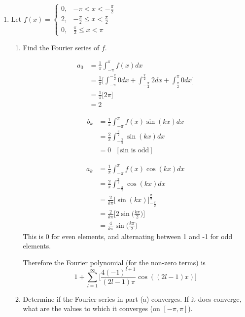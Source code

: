 \documentclass{article}
\begin{document}
\thispagestyle{fancy}

\begin{enumerate}
\item Let $\displaystyle f(x) = 
\begin{cases}
        0, &- \pi < x < -\frac{\pi}{2} \\
        2, &- \frac{\pi}{2}\leq x < \frac{\pi}{2} \\
        0, & \frac{\pi}{2} \leq x < \pi
\end{cases}
$
\begin{enumerate}
\item Find the Fourier series of $f$.
\begin{multicols}{2}
\noindent

\begin{align*}
a_0 &= \frac{1}{\pi} \int_{-\pi}^{\pi}f(x)dx \\
&= \frac{1}{\pi} \Bigg[ \int_{-\pi}^{-\frac{\pi}{2}}0dx + \int_{-\frac{\pi}{2}}^{\frac{\pi}{2}}2dx + \int_{\frac{\pi}{2}}^{\pi}0dx \Bigg]\\
&= \frac{1}{\pi} \Bigg[2\pi\Bigg]\\
&= 2
\end{align*}

\begin{align*}
b_k &= \frac{1}{\pi} \int_{-\pi}^{\pi}f(x)\sin(kx)dx \\
&= \frac{2}{\pi} \int_{-\frac{\pi}{2}}^{\frac{\pi}{2}}\sin(kx)dx \\
&= 0 \: \: \: [\text{sin is odd}]
\end{align*}

\begin{align*}
a_k &= \frac{1}{\pi} \int_{-\pi}^{\pi}f(x)\cos(kx)dx \\
&= \frac{2}{\pi} \int_{-\frac{\pi}{2}}^{\frac{\pi}{2}}\cos(kx)dx \\
&= \frac{2}{k\pi} \Bigg[\sin(kx)\Bigg]_{-\frac{\pi}{2}}^{\frac{\pi}{2}} \\
&= \frac{2}{k\pi} \Bigg[2\sin\Big(\frac{k\pi}{2}\Big)\Bigg]\\
&= \frac{4}{k\pi} \sin\Big(\frac{k\pi}{2}\Big)
\end{align*}
This is 0 for even elements, and alternating between 1 and -1 for odd elements.
\end{multicols}

Therefore the Fourier polynomial (for the non-zero terms) is 
\[
    1 + \sum_{l=1}^{\infty} \Bigg[ \frac{4(-1)^{l+1}}{(2l-1)\pi}\cos((2l-1)x)\Bigg]
\]
\item Determine if the Fourier series in part (a) converges. If it does converge, what are the values to which it converges (on $[-\pi, \pi]$).


\end{enumerate}
\end{enumerate}
\end{document}
